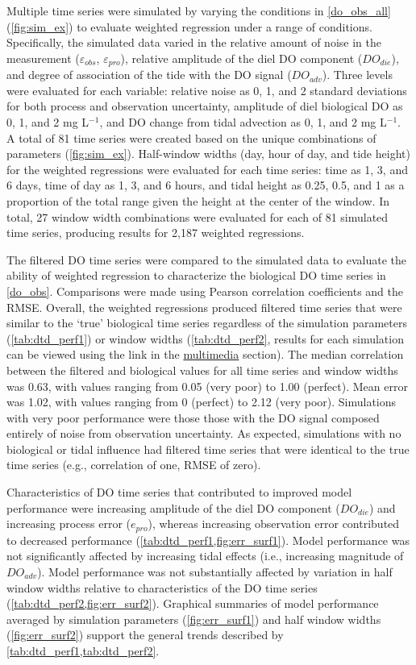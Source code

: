 \documentclass[letterpaper,12pt,oneside]{article}\usepackage[]{graphicx}\usepackage[]{color}
\begin{document}
Multiple time series were simulated by varying the conditions in \cref{do_obs_all} (\cref{fig:sim_ex}) to evaluate weighted regression under a range of conditions. Specifically, the simulated data varied in the relative amount of noise in the measurement ($\varepsilon_{obs}$, $\varepsilon_{pro}$), relative amplitude of the diel \ac{DO} component ($DO_{die}$), and degree of association of the tide with the \ac{DO} signal ($DO_{adv}$).  Three levels were evaluated for each variable: relative noise as 0, 1, and 2 standard deviations for both process and observation uncertainty, amplitude of diel biological \ac{DO} as 0, 1, and 2 mg L$^{-1}$, and \ac{DO} change from tidal advection as 0, 1, and 2 mg L$^{-1}$. A total of 81 time series were created based on the unique combinations of parameters (\cref{fig:sim_ex}).  Half-window widths (day, hour of day, and tide height) for the weighted regressions were evaluated for each time series: time as 1, 3, and 6 days, time of day as 1, 3, and 6 hours, and tidal height as 0.25, 0.5, and 1 as a proportion of the total range given the height at the center of the window.  In total, 27 window width combinations were evaluated for each of 81 simulated time series, producing results for 2,187 weighted regressions.

The filtered \ac{DO} time series were compared to the simulated data to evaluate the ability of weighted regression to characterize the biological \ac{DO} time series in \cref{do_obs}. Comparisons were made using Pearson correlation coefficients and the \ac{RMSE}.  Overall, the weighted regressions produced filtered time series that were similar to the `true' biological time series regardless of the simulation parameters (\cref{tab:dtd_perf1}) or window widths (\cref{tab:dtd_perf2}, results for each simulation can be viewed using the link in the \hyperref[multi]{multimedia} section).  The median correlation between the filtered and biological values for all time series and window widths was 0.63, with values ranging from 0.05 (very poor) to 1.00 (perfect).  Mean error was 1.02, with values ranging from 0 (perfect) to 2.12 (very poor).  Simulations with very poor performance were those those with the \ac{DO} signal composed entirely of noise from observation uncertainty. As expected, simulations with no biological or tidal influence had filtered time series that were identical to the true time series (e.g., correlation of one, \ac{RMSE} of zero).  

Characteristics of \ac{DO} time series that contributed to improved model performance were increasing amplitude of the diel \ac{DO} component ($DO_{die}$) and increasing process error ($e_{pro}$), whereas increasing observation error contributed to decreased performance (\cref{tab:dtd_perf1,fig:err_surf1}).  Model performance was not significantly affected by increasing tidal effects (i.e., increasing magnitude of $DO_{adv}$).  Model performance was not substantially affected by variation in half window widths relative to characteristics of the \ac{DO} time series (\cref{tab:dtd_perf2,fig:err_surf2}).  Graphical summaries of model performance averaged by simulation parameters (\cref{fig:err_surf1}) and half window widths (\cref{fig:err_surf2}) support the general trends described by \cref{tab:dtd_perf1,tab:dtd_perf2}.
\end{document}
